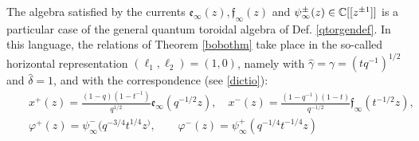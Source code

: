 \begin{remark}
The algebra satisfied by the currents ${\mathfrak e}_\infty(z),{\mathfrak f}_\infty(z)$ and 
$\psi^\pm_\infty(z)\in {\mathbb C}[[z^{\pm 1}]]$ is a particular case of
the general quantum toroidal algebra of Def. \ref{qtorgendef}. 
In this language, the relations of Theorem \ref{bobothm} take place in the so-called horizontal representation
$(\ell_1,\ell_2)=(1,0)$, namely with ${\hat \gamma}=\gamma=(tq^{-1})^{1/2}$ and $\hat \delta=1$,
and with the correspondence (see \eqref{dictio}):
\begin{eqnarray}
&&x^+(z)= \frac{(1-q)(1-t^{-1})}{q^{1/2}}{\mathfrak e}_\infty(q^{-1/2}z),\quad x^-(z)
=\frac{(1-q^{-1})(1-t)}{q^{-1/2}}{\mathfrak f}_\infty(t^{-1/2}z),\nonumber \\ 
&&\varphi^+(z)= \psi_\infty^-(q^{-3/4}t^{1/4}z^),\qquad \varphi^-(z)= \psi_\infty^+(q^{-1/4}t^{-1/4}z)
\label{corresp}
\end{eqnarray}
\end{remark}

